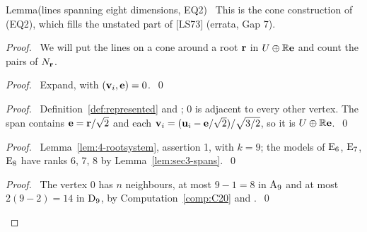 \begin{namedresult}{Lemma}{(lines spanning eight dimensions, EQ2)}\label{lem:4-EQ2}
 \repair\ This is the cone construction of  (EQ2), which fills
 the unstated part of [LS73] (errata, Gap 7).
\end{namedresult}
\begin{proof}
 \pfsketch\ We will put the lines on a cone around a root ${\mathbf r}$ in $U\oplus{\mathbb R}{\mathbf e}$ and count
 the pairs of $N_{\mathbf r}$.
 \begin{proof}\pf\ Expand, with $({\mathbf v}_i,{\mathbf e})=0$.~\qed\end{proof}
 \begin{proof}\pf\ Definition~\ref{def:represented} and ; 0 is adjacent to
  every other vertex. The span contains ${\mathbf e}={\mathbf r}/\sqrt2$ and each
  ${\mathbf v}_i=({\mathbf u}_i-{\mathbf e}/\sqrt2)/\sqrt{3/2}$, so it is $U\oplus{\mathbb R}{\mathbf e}$.~\qed\end{proof}
 \begin{proof}\pf\ Lemma~\ref{lem:4-rootsystem}, assertion 1, with $k=9$; the models of
  $\mathrm{E}_6$, $\mathrm{E}_7$, $\mathrm{E}_8$ have ranks 6, 7, 8 by
  Lemma~\ref{lem:sec3-spans}.~\qed\end{proof}
 \qedstep
 \begin{proof}\pf\ The vertex 0 has $n$ neighbours, at most $9-1=8$ in $\mathrm{A}_9$ and at most
  $2(9-2)=14$ in $\mathrm{D}_9$, by Computation~\ref{comp:C20} and .~\qed\end{proof}
\end{proof}


